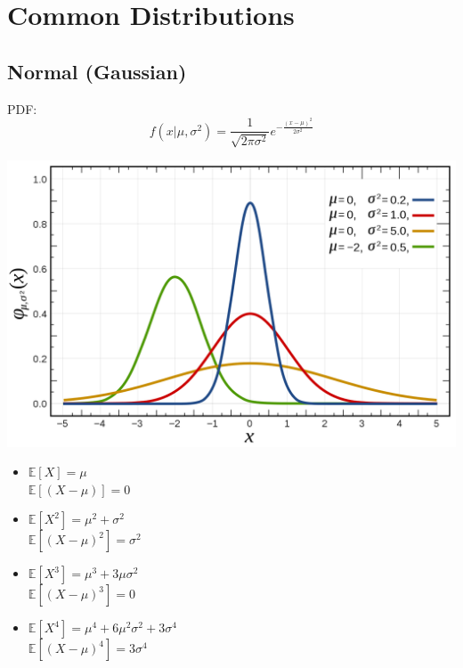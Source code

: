 \documentclass[DIV=14,titlepage=false]{scrreprt}
\begin{document}
\section{Common Distributions}

\subsection*{Normal (Gaussian)}
PDF: \[ \displaystyle f(x|\mu,\sigma^2) = \frac{1}{\sqrt{2\pi\sigma^2}} e^{-\frac{(x-\mu)^2}{2\sigma^2}} \]
\vspace{10pt}

\begin{minipage}[c]{0.5\textwidth}
\includegraphics[width=\textwidth]{./Images/univariateNormal.png}
\end{minipage}
\hfill
\begin{minipage}[c]{0.45\textwidth}
  \begin{itemize}
    \item $ \mathbb{E}[X] = \mu $ \\
    $ \mathbb{E}[(X - \mu)] = 0 $
    \item $ \mathbb{E}[X^2] = \mu^2 + \sigma^2 $ \\
    $ \mathbb{E}[(X - \mu)^2] = \sigma^2 $
    \item $ \mathbb{E}[X^3] = \mu^3 + 3\mu\sigma^2 $ \\
    $ \mathbb{E}[(X - \mu)^3] = 0 $
    \item $ \mathbb{E}[X^4] = \mu^4 + 6\mu^2\sigma^2 + 3\sigma^4 $ \\
    $ \mathbb{E}[(X - \mu)^4] = 3\sigma^4 $
  \end{itemize}
  
\end{minipage}
\end{document}
